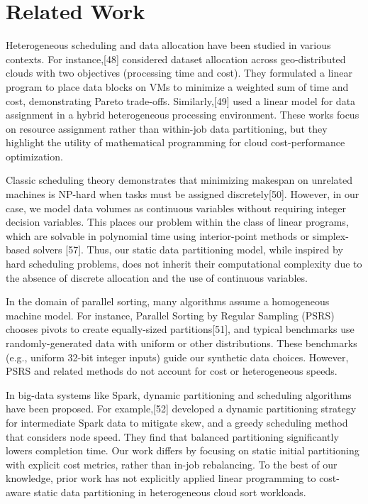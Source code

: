 \documentclass[]{interact}
\theoremstyle{plain}
\theoremstyle{definition}
\theoremstyle{remark}
\begin{document}
\section{Related Work}
\label{sec:related_work}
Heterogeneous scheduling and data allocation have been studied in various contexts. For instance,[48] considered dataset allocation across geo-distributed clouds with two objectives (processing time and cost). They formulated a linear program to place data blocks on VMs to minimize a weighted sum of time and cost, demonstrating Pareto trade-offs. Similarly,[49] used a linear model for data assignment in a hybrid heterogeneous processing environment. These works focus on resource assignment rather than within-job data partitioning, but they highlight the utility of mathematical programming for cloud cost-performance optimization.

Classic scheduling theory demonstrates that minimizing makespan on unrelated machines is NP-hard when tasks must be assigned discretely[50]. However, in our case, we model data volumes as continuous variables without requiring integer decision variables. This places our problem within the class of linear programs, which are solvable in polynomial time using interior-point methods or simplex-based solvers [57]. Thus, our static data partitioning model, while inspired by hard scheduling problems, does not inherit their computational complexity due to the absence of discrete allocation and the use of continuous variables.

In the domain of parallel sorting, many algorithms assume a homogeneous machine model. For instance, Parallel Sorting by Regular Sampling (PSRS) chooses pivots to create equally-sized partitions[51], and typical benchmarks use randomly-generated data with uniform or other distributions. These benchmarks (e.g., uniform 32-bit integer inputs) guide our synthetic data choices. However, PSRS and related methods do not account for cost or heterogeneous speeds.

In big-data systems like Spark, dynamic partitioning and scheduling algorithms have been proposed. For example,[52] developed a dynamic partitioning strategy for intermediate Spark data to mitigate skew, and a greedy scheduling method that considers node speed. They find that balanced partitioning significantly lowers completion time. Our work differs by focusing on static initial partitioning with explicit cost metrics, rather than in-job rebalancing. To the best of our knowledge, prior work has not explicitly applied linear programming to cost-aware static data partitioning in heterogeneous cloud sort workloads.
\end{document}
